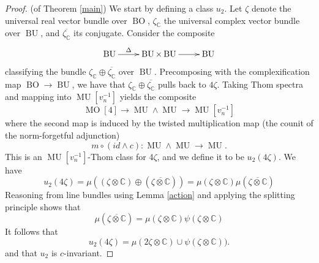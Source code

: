 \documentclass[12pt]{amsart}
\numberwithin{equation}{section}
\theoremstyle{plain}  %
\theoremstyle{definition}  %
\newcommand{\CC}{\mathbb{C}}
\newcommand{\MU}{\mathbb {MU}}
\DeclareMathOperator{\BOg}{BO}
\DeclareMathOperator{\BUg}{BU}
\DeclareMathOperator{\MO}{MO}
\DeclareMathOperator{\MUR}{MR}
\DeclareMathOperator{\MUg}{MU}
\begin{document}
\medskip
\noindent
\begin{proof}  (of Theorem \ref{main}) We start by defining a class $u_2$. Let $\zeta$ denote the universal real vector bundle over $\BOg$, $\zeta_{\CC}$ the universal complex vector bundle over $\BUg$, and $\overline{\zeta_{\CC}}$ its conjugate. Consider the composite
$$\xymatrix{\BUg \ar@{->}[r]^-{\Delta} & \BUg \times \BUg \ar@{->}[r] & \BUg}$$
classifying the bundle $\zeta_{\CC} \oplus \overline{\zeta_{\CC}}$ over $\BUg$. Precomposing with the complexification map $\BOg \longrightarrow \BUg$, we have that $\zeta_{\CC} \oplus \overline{\zeta_{\CC}}$ pulls back to $4\zeta$. Taking Thom spectra and mapping into $\MUg[v_n^{-1}]$ yields the composite
$$\MO[4] \longrightarrow \MUg \wedge \MUg \longrightarrow  \MUg[v_n^{-1}]$$
where the second map is induced by the twisted multiplication map (the counit of the norm-forgetful adjunction)
\[ m \circ (id \wedge c) : \MUg \wedge \MUg \longrightarrow \MUg. \]
This is an $\MUg[v_n^{-1}]$-Thom class for $4\zeta$, and we define it to be $u_2(4\zeta)$.
We have
$$u_2(4\zeta)=\mu((\zeta \otimes \CC) \oplus (\overline{\zeta \otimes \CC}))=\mu(\zeta \otimes \CC)\mu(\overline{\zeta \otimes \CC})$$
Reasoning from line bundles  using Lemma \ref{action} and applying the splitting principle shows that 
$$\mu(\overline{\zeta \otimes \CC})=\mu(\zeta \otimes \CC)\psi(\zeta \otimes \CC)$$
It follows that 
\[ u_{2}(4 \zeta) = \mu(2 \zeta \otimes \CC) \cup \psi(\zeta \otimes \CC)). \]
and that $u_2$ is $c$-invariant.



\end{proof}
\end{document}
